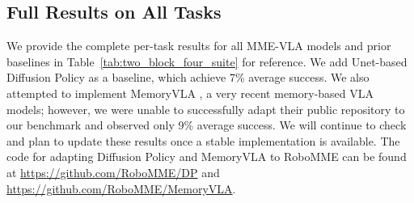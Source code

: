 \clearpage
\subsection{Full Results on All Tasks}
\label{sec:results_all_tasks}

We provide the complete per-task results for all MME-VLA models and prior baselines in Table~\ref{tab:two_block_four_suite} for reference. We add Unet-based Diffusion Policy \cite{chi2025diffusion} as a baseline, which achieve 7\% average success. 
We also attempted to implement MemoryVLA \cite{shi2025memoryvla}, a very recent memory-based VLA models; however, we were unable to successfully adapt their public repository to our benchmark and observed only 9\% average success. 
We will continue to check and plan to update these results once a stable implementation is available.
The code for adapting Diffusion Policy and MemoryVLA to RoboMME can be found at \url{https://github.com/RoboMME/DP} and
\url{https://github.com/RoboMME/MemoryVLA}.


